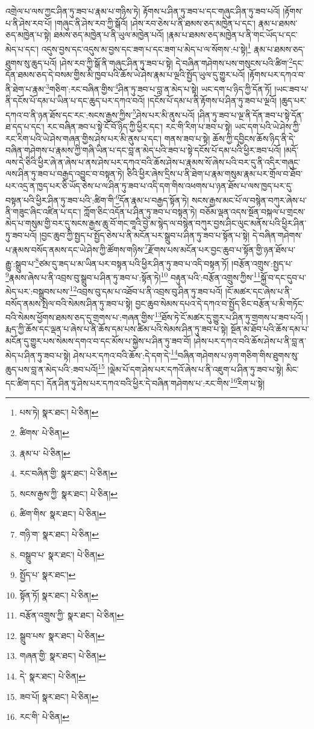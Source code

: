 འགྲེལ་པ་ལས་ཀྱང་ཤིན་ཏུ་ཟབ་པ་རྣམ་པ་གཉིས་ཏེ། རྟོགས་པ་ཤིན་ཏུ་ཟབ་པ་དང་གཞུང་ཤིན་ཏུ་ཟབ་པའོ། །རྟོགས་པ་ནི་ཤེས་རབ་པོ། །གཞུང་ནི་ཤེས་རབ་ཀྱི་སྒོའོ། །ཤེས་རབ་ཅེས་པ་ནི་ཐམས་ཅད་མཁྱེན་པ་དང་། རྣམ་པ་ཐམས་ཅད་མཁྱེན་པ་སྟེ། ཐམས་ཅད་མཁྱེན་པ་ནི་ཡུལ་མཁྱེན་པའོ། །རྣམ་པ་ཐམས་ཅད་མཁྱེན་པ་ནི་གང་ཡོད་པ་དང་མེད་པ་དང་། འདུས་བྱས་དང་འདུས་མ་བྱས་དང་ཟག་པ་དང་ཟག་པ་མེད་པ་ལ་སོགས་:པ་སྟེ།\footnote{པས་ཏེ།  སྣར་ཐང་།  པེ་ཅིན། } རྣམ་པ་ཐམས་ཅད་ཐུགས་སུ་ཆུད་པའོ། །ཤེས་རབ་ཀྱི་སྒོ་ནི་གཞུང་ཤིན་ཏུ་ཟབ་པ་སྟེ། དེ་བཞིན་གཤེགས་པས་གསུངས་པའི་ཚིག་\footnote{ཚིགས་  པེ་ཅིན། }དང་དོན་ཐམས་ཅད་དེ་བསམ་གྱིས་མི་ཁྱབ་པའི་ཆོས་ཡེ་ཤེས་རྣམ་པ་ལྔའི་སྤྱོད་ཡུལ་དུ་གྱུར་པའོ། །རྟོགས་པར་དཀའ་བ་ནི་ཐེག་པ་རྣམ་\footnote{རྣམ་པ་  པེ་ཅིན། }གཅིག་:རང་བཞིན་གྱིས་\footnote{རང་བཞིན་གྱི་  སྣར་ཐང་།  པེ་ཅིན། }ཤིན་ཏུ་ཟབ་པ་བླ་ན་མེད་པ་སྟེ། ཡང་དག་པ་ཉིད་ཀྱི་དོན་ཏོ། །ཡང་ཟབ་པ་ནི་དངོས་པོ་དམ་པ་ཡིན་པ་དང་ཆུད་པར་དཀའ་བའོ། །དངོས་པོ་དམ་པ་ནི་རྟོགས་པ་ཤིན་ཏུ་ཟབ་པ་ལྔའོ། །ཆུད་པར་དཀའ་བ་ནི་ཉན་ཐོས་དང་རང་:སངས་རྒྱས་ཀྱིས་\footnote{སངས་རྒྱས་ཀྱི་  སྣར་ཐང་།  པེ་ཅིན། }ཤེས་པར་མི་ནུས་པའོ། །ཤིན་ཏུ་ཟབ་པ་ལྔ་ནི་དོན་ཟབ་པ་སྟེ་དོན་ཐ་དད་པ་དང་། རང་བཞིན་ཟབ་པ་སྟེ་ངོ་བོ་ཉིད་ཀྱི་ཕྱིར་དང་། རང་གི་རིག་པ་ཟབ་པ་སྟེ། ཡང་དག་པའི་ཡེ་ཤེས་ཀྱི་རང་རིག་པའི་ཡེ་ཤེས་གཞན་གྱིས་ཤེས་པར་མི་ནུས་པ་དང་། གནས་ཟབ་པ་སྟེ། ཆོས་ཀྱི་དབྱིངས་ཆོས་ཉིད་ནི་དེ་བཞིན་གཤེགས་པ་རྣམས་ཀྱི་གཞི་ཡིན་པ་དང་བླ་ན་མེད་པའི་ཟབ་པ་སྟེ་དངོས་པོ་དམ་པའི་ཕྱིར་ཟབ་པའོ། །མདོ་ལས་དེ་ཅིའི་ཕྱིར་ཞེ་ན་ཞེས་པ་ནས་ཤེས་པར་དཀའ་བའི་ཆོས་ཤེས་པ་རྣམས་སོ་ཞེས་པའི་བར་དུ་ནི་འདིར་གཞུང་ལས་ཤིན་ཏུ་ཟབ་པ་བརྒྱད་འབྱུང་བ་བསྟན་ཏེ། ཅིའི་ཕྱིར་ཞེས་དྲིས་པ་ནི་ཐེག་པ་རྣམ་གསུམ་རྣམ་པར་གྲོལ་བ་ཐོབ་པར་འདྲ་ན་ཁྱད་པར་ཅི་ཡོད་ཅེས་པ་ལ་ཤིན་ཏུ་ཟབ་པ་འདི་དག་གིས་འཕགས་པ་ཉན་ཐོས་པ་ལས་ཁྱད་པར་དུ་བསྟན་པའི་ཕྱིར་ཤིན་ཏུ་ཟབ་པའི་:ཚིག་གི་\footnote{ཚིག་གིས་  སྣར་ཐང་།  པེ་ཅིན། }དོན་རྣམ་པ་བརྒྱད་སྟོན་ཏེ། སངས་རྒྱས་མང་པོ་ལ་བསྙེན་བཀུར་ཞེས་པ་ནི་གཟུང་ཞིང་འཛིན་པ་དང་། ཀློག་ཅིང་འདོན་པ་ཤིན་ཏུ་ཟབ་པ་བསྟན་ཏེ། བཅོམ་ལྡན་འདས་སྔོན་བསྐལ་པ་གྲངས་མེད་པ་གསུམ་གྱི་བར་དུ་སངས་རྒྱས་ཆུ་བོ་གང་གཱའི་བྱེ་མ་སྙེད་ལ་བསྙེན་བཀུར་བྱས་ཤིང་ལུང་མནོས་པའི་ཕྱིར་ཤིན་ཏུ་ཟབ་པའོ། །བྱང་ཆུབ་ཀྱི་སྤྱད་པ་སྤྱོད་ཅེས་པ་ནི་མངོན་པར་སྒྲུབ་པ་ཤིན་ཏུ་ཟབ་པ་སྟོན་པ་སྟེ། དེ་བཞིན་གཤེགས་པ་རྣམས་བསོད་ནམས་དང་ཡེ་ཤེས་ཀྱི་ཚོགས་གཉིས་\footnote{གཉི་ག་  སྣར་ཐང་།  པེ་ཅིན། }རྫོགས་པས་མངོན་པར་བྱང་ཆུབ་པ་སྟོན་གྱི་ཉན་ཐོས་པ་རྒྱུ་:སྒྲུབ་པ་\footnote{བསྒྲུབ་པ་  སྣར་ཐང་།  པེ་ཅིན། }ཙམ་དུ་ཟད་པ་མ་ཡིན་པར་བསྟན་པའི་ཕྱིར་ཤིན་ཏུ་ཟབ་པ་འདི་བསྟན་ཏོ། །བརྩོན་འགྲུས་:སྤྱད་པ་\footnote{སྤྱོད་པ་  སྣར་ཐང་། }རྣམས་ཞེས་པ་ནི་འབྲས་བུ་སྒྲུབ་པ་ཤིན་ཏུ་ཟབ་པ་:སྟོན་ཏེ།\footnote{སྟོན་ཏོ།  སྣར་ཐང་།  པེ་ཅིན། } བརྟུན་པའི་:བརྩོན་འགྲུས་ཀྱིས་\footnote{བརྩོན་འགྲུས་ཀྱི་  སྣར་ཐང་།  པེ་ཅིན། }སྐྱོ་བ་དང་དུབ་པ་མེད་པར་:བསྒྲུབས་པས་\footnote{སྒྲུབ་པས་  སྣར་ཐང་།  པེ་ཅིན། }འབྲས་བུ་དམ་པ་འཐོབ་པ་ནི་འབྲས་བུ་ཤིན་ཏུ་ཟབ་པའོ། །ངོ་མཚར་དང་ཞེས་པ་ནི་བསོད་ནམས་སྤེལ་བའི་སེམས་ཤིན་ཏུ་ཟབ་པ་སྟེ། བྱང་ཆུབ་སེམས་དཔའ་དེ་དཀའ་བ་སྤྱོད་ཅིང་བརྩོན་པ་མི་གཏོང་བའི་སེམས་ཕྱོགས་ཐམས་ཅད་དུ་གྲགས་པ་:གཞན་གྱིས་\footnote{གཞན་གྱི་  སྣར་ཐང་།  པེ་ཅིན། }ཐོས་ཏེ་ངོ་མཚར་དུ་གྱུར་པ་ཤིན་ཏུ་གྲགས་པ་ཟབ་པའོ། །རྨད་ཀྱི་ཆོས་དང་ལྡན་པ་ཞེས་པ་ནི་ཆོས་དམ་པས་ཚིམ་པའི་སེམས་ཤིན་ཏུ་ཟབ་པ་སྟེ། སྔོན་མ་ཐོབ་པའི་ཆོས་དམ་པ་མངོན་དུ་གྱུར་པས་སེམས་དགའ་བ་དང་མོས་པ་སྐྱེས་པ་ཤིན་ཏུ་ཟབ་བོ། །ཤེས་པར་དཀའ་བའི་ཆོས་ཤེས་པ་ནི་བླ་ན་མེད་པ་ཤིན་ཏུ་ཟབ་པ་སྟེ། ཤེས་པར་དཀའ་བའི་ཆོས་:དེ་དག་དེ་\footnote{དེ་  སྣར་ཐང་།  པེ་ཅིན། }བཞིན་གཤེགས་པ་ཉག་གཅིག་གིས་ཐུགས་སུ་ཆུད་པས་བླ་ན་མེད་པའི་:ཟབ་པའོ།\footnote{ཟབ་པོ།  སྣར་ཐང་།  པེ་ཅིན། } །ལྡེམ་པོ་དག་ཤེས་པར་དཀའོ་ཞེས་པ་ནི་འཇུག་པ་ཤིན་ཏུ་ཟབ་པ་སྟེ། མིང་དང་ཚིག་དང་། དོན་ཤིན་ཏུ་ཤེས་པར་དཀའ་བའི་ཕྱིར་དེ་བཞིན་གཤེགས་པ་:རང་གིས་\footnote{རང་གི་  པེ་ཅིན། }རིག་པ་སྟེ། 
